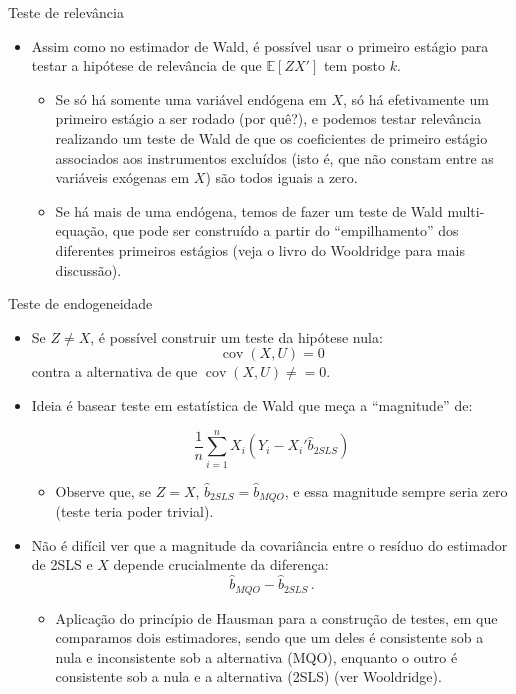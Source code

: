 \documentclass[11pt]{beamer}
\begin{document}
\begin{frame}{Teste de relevância}
	\begin{itemize}
		\item Assim como no estimador de Wald, é possível usar o primeiro estágio para testar a hipótese de relevância de que $\mathbb{E}[ZX']$ tem posto $k$.
		\begin{itemize}
			\item Se só há somente uma variável endógena em $X$, só há efetivamente um primeiro estágio a ser rodado (por quê?), e podemos testar relevância realizando um teste de Wald de que os coeficientes de primeiro estágio associados aos instrumentos excluídos (isto é, que não constam entre as variáveis exógenas em $X$) são todos iguais a zero.
			\item Se há mais de uma endógena, temos de fazer um teste de Wald multi-equação, que pode ser construído a partir do ``empilhamento'' dos diferentes primeiros estágios (veja o livro do Wooldridge para mais discussão).
		\end{itemize}
	\end{itemize}
\end{frame}
\begin{frame}{Teste de endogeneidade}
\begin{itemize}
	\item Se $Z \neq X$, é possível construir um teste da hipótese nula:
	$$\operatorname{cov}(X,U) = 0$$
	contra a alternativa de que $\operatorname{cov}(X,U)\neq =0$.
	\item Ideia é basear teste em estatística de Wald que meça a  ``magnitude'' de:
	
	$$\frac{1}{n}\sum_{i=1}^n X_i (Y_i - X_i'\hat{b}_{2SLS})$$
	\vspace{-1em}
	\begin{itemize}
		\item Observe que, se $Z = X$, $\hat{b}_{2SLS}=\hat{b}_{MQO}$, e essa magnitude sempre seria zero (teste teria poder trivial).
	\end{itemize}
	\item Não é difícil ver que a magnitude da covariância entre o resíduo do estimador de 2SLS e $X$ depende crucialmente da diferença:
	$$\hat{b}_{MQO} -\hat{b}_{2SLS}\, .$$
	\vspace{-1em}
	\begin{itemize}
		\item Aplicação do {\color{blue}princípio de Hausman} para a construção de testes, em que comparamos dois estimadores, sendo que um deles é consistente sob a nula e inconsistente sob a alternativa (MQO), enquanto o outro é consistente sob a nula e a alternativa (2SLS) (ver Wooldridge).
	\end{itemize}
\end{itemize}
\end{frame}
\end{document}
